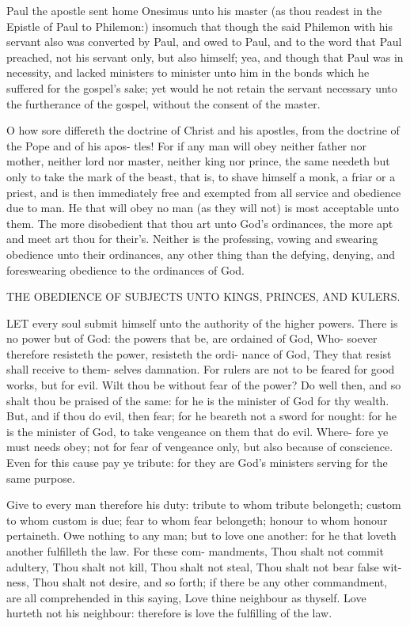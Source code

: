 \documentclass{custom}
\begin{document}
Paul the apostle sent home Onesimus unto his master 
(as thou readest in the Epistle of Paul to Philemon:) 
insomuch that though the said Philemon with his servant 
also was converted by Paul, and owed to Paul, and 
to the word that Paul preached, not his servant only, but 
also himself; yea, and though that Paul was in necessity, 
and lacked ministers to minister unto him in the bonds 
which he suffered for the gospel's sake; yet would he not 
retain the servant necessary unto the furtherance of the 
gospel, without the consent of the master.

O how sore differeth the doctrine of Christ and his 
apostles, from the doctrine of the Pope and of his apos-
tles! For if any man will obey neither father nor 
mother, neither lord nor master, neither king nor prince, 
the same needeth but only to take the mark of the beast, 
that is, to shave himself a monk, a friar or a priest, and is 
then immediately free and exempted from all service and 
obedience due to man. He that will obey no man (as 
they will not) is most acceptable unto them. The more 
disobedient that thou art unto God's ordinances, the more 
apt and meet art thou for their's. Neither is the professing, 
vowing and swearing obedience unto their ordinances, any 
other thing than the defying, denying, and foreswearing 
obedience to the ordinances of God.


THE OBEDIENCE OF SUBJECTS UNTO KINGS, 
PRINCES, AND KULERS. 

LET every soul submit himself unto the authority of 
the higher powers. There is no power but of 
God: the powers that be, are ordained of God, Who- 
soever therefore resisteth the power, resisteth the ordi- 
nance of God, They that resist shall receive to them- 
selves damnation. For rulers are not to be feared for 
good works, but for evil. Wilt thou be without fear of 
the power? Do well then, and so shalt thou be praised 
of the same: for he is the minister of God for thy
wealth. But, and if thou do evil, then fear; for he 
beareth not a sword for nought: for he is the minister 
of God, to take vengeance on them that do evil. Where- 
fore ye must needs obey; not for fear of vengeance only, 
but also because of conscience. Even for this cause pay 
ye tribute: for they are God's ministers serving for the 
same purpose. 

Give to every man therefore his duty: tribute to whom 
tribute belongeth; custom to whom custom is due; fear 
to whom fear belongeth; honour to whom honour pertaineth. 
Owe nothing to any man; but to love one another: for 
he that loveth another fulfilleth the law. For these com- 
mandments, Thou shalt not commit adultery, Thou shalt 
not kill, Thou shalt not steal, Thou shalt not bear false wit- 
ness, Thou shalt not desire, and so forth; if there be any other 
commandment, are all comprehended in this saying, Love 
thine neighbour as thyself. Love hurteth not his neighbour:
therefore is love the fulfilling of the law. 
\end{document}
